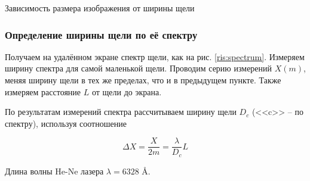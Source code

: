 \documentclass[a5paper,10pt, twoside]{article} %
\begin{document}
	\begin{table}[h]
		\caption{Зависимость размера изображения от ширины щели}
	\end{table}

\subsubsection{Определение ширины щели по её спектру}

	Получаем на удалённом экране спектр щели, как на рис. \ref{ris:spectrum}. Измеряем ширину спектра 
	для самой маленькой щели. Проводим серию измерений $X(m)$, меняя ширину щели в тех же
	пределах, что и в предыдущем пункте. Также измеряем расстояние $L$ от щели до экрана.

	По результатам измерений спектра рассчитываем ширину щели $D_c$ (<<c>> -- по спектру), используя
	соотношение

	\begin{equation}
		\Delta X = \frac{X}{2m} = \frac{\lambda}{D_c} L
	\end{equation}

	Длина волны He-Ne лазера $\lambda = 6328$ \AA.
\end{document}
